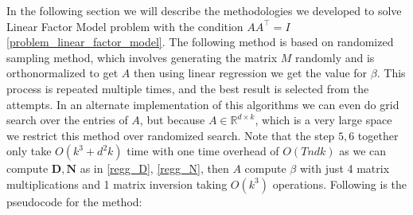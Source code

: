 In the following section we will describe the methodologies we developed to solve Linear Factor Model problem with the condition $AA^\top =I$ \ref{problem_linear_factor_model}.
 The following method is based on randomized sampling method, which involves generating the matrix $M$ randomly and is orthonormalized to get $A$ then using linear regression we get the value for $\beta$. This process is repeated multiple times, and the best result is selected from the attempts. In an alternate implementation of this algorithms we can even do grid search over the entries of $A$, but because $A\in \mathbb{R}^{d\times k}$, which is a very large space we restrict this method over randomized search. Note that the step $5,6$ together only take $O(k^3+d^2k)$ time with one time overhead of $O(Tndk)$ as we can compute $\mathbf{D}, \mathbf{N}$ as in \ref{regg_D}, \ref{regg_N}, then $A$ compute $\beta$ with just 4 matrix multiplications and 1 matrix inversion taking $O(k^3)$ operations. Following is the pseudocode for the method:
